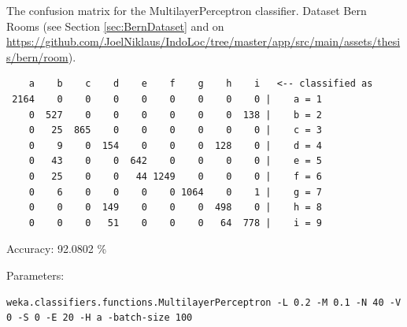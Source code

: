\begin{table}[H]
\caption{The confusion matrix for the MultilayerPerceptron classifier. Dataset Bern Rooms (see Section \ref{sec:BernDataset} and on \url{https://github.com/JoelNiklaus/IndoLoc/tree/master/app/src/main/assets/thesis/bern/room}).}
\label{ver:ConfusionMatrixMultilayerPerceptron}
\begin{threeparttable}
\begin{verbatim}
    a    b    c    d    e    f    g    h    i   <-- classified as
 2164    0    0    0    0    0    0    0    0 |    a = 1
    0  527    0    0    0    0    0    0  138 |    b = 2
    0   25  865    0    0    0    0    0    0 |    c = 3
    0    9    0  154    0    0    0  128    0 |    d = 4
    0   43    0    0  642    0    0    0    0 |    e = 5
    0   25    0    0   44 1249    0    0    0 |    f = 6
    0    6    0    0    0    0 1064    0    1 |    g = 7
    0    0    0  149    0    0    0  498    0 |    h = 8
    0    0    0   51    0    0    0   64  778 |    i = 9
\end{verbatim}
\begin{tablenotes}
\item Accuracy: 92.0802 \% 
\item Parameters:
\tiny{
\begin{verbatim}
weka.classifiers.functions.MultilayerPerceptron -L 0.2 -M 0.1 -N 40 -V 0 -S 0 -E 20 -H a -batch-size 100
\end{verbatim}
}
\end{tablenotes}
\end{threeparttable}
\end{table}



